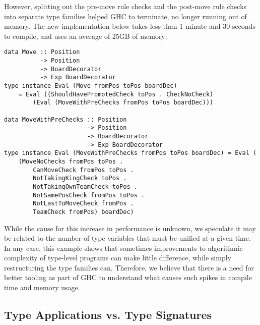 \documentclass[12pt, a4paper, bibliography=totocnumbered]{scrreprt}
\begin{document}
However, splitting out the pre-move rule checks and the post-move rule checks into separate type families helped GHC to terminate, no longer running out of memory. The new implementation below takes less than 1 minute and 30 seconds to compile, and uses an average of 25GB of memory:
\begin{lstlisting}
data Move :: Position
          -> Position
          -> BoardDecorator
          -> Exp BoardDecorator
type instance Eval (Move fromPos toPos boardDec)
    = Eval ((ShouldHavePromotedCheck toPos . CheckNoCheck)
        (Eval (MoveWithPreChecks fromPos toPos boardDec)))

data MoveWithPreChecks :: Position
                       -> Position
                       -> BoardDecorator
                       -> Exp BoardDecorator
type instance Eval (MoveWithPreChecks fromPos toPos boardDec) = Eval (
    (MoveNoChecks fromPos toPos .
        CanMoveCheck fromPos toPos .
        NotTakingKingCheck toPos .
        NotTakingOwnTeamCheck toPos .
        NotSamePosCheck fromPos toPos .
        NotLastToMoveCheck fromPos .
        TeamCheck fromPos) boardDec)
\end{lstlisting}
While the cause for this increase in performance is unknown, we speculate it may be related to the number of type variables that must be unified at a given time. In any case, this example shows that sometimes improvements to algorithmic complexity of type-level programs can make little difference, while simply restructuring the type families can. Therefore, we believe that there is a need for better tooling as part of GHC to understand what causes such spikes in compile time and memory usage.

\subsection{Type Applications vs. Type Signatures}
\end{document}
